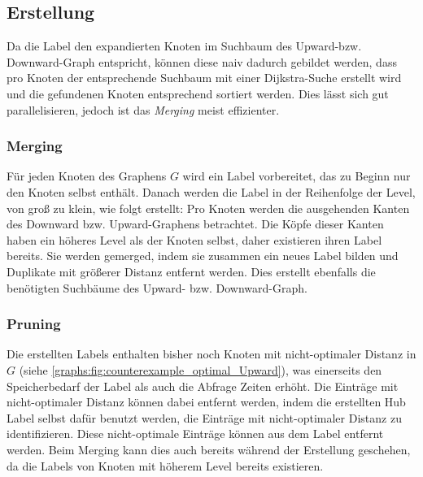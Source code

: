 \subsection{Erstellung}

Da die Label den expandierten Knoten im Suchbaum des Upward-bzw. Downward-Graph entspricht, können diese naiv dadurch gebildet werden, dass pro Knoten der entsprechende Suchbaum mit einer Dijkstra-Suche erstellt wird und die gefundenen Knoten entsprechend sortiert werden.
Dies lässt sich gut parallelisieren, jedoch ist das \emph{Merging} meist effizienter.

\subsubsection{Merging}

Für jeden Knoten des Graphens $G$ wird ein Label vorbereitet, das zu Beginn nur den Knoten selbst enthält.
Danach werden die Label in der Reihenfolge der Level, von groß zu klein, wie folgt erstellt:
Pro Knoten werden die ausgehenden Kanten des Downward bzw. Upward-Graphens betrachtet.
Die Köpfe dieser Kanten haben ein höheres Level als der Knoten selbst, daher existieren ihren Label bereits.
Sie werden gemerged, indem sie zusammen ein neues Label bilden und Duplikate mit größerer Distanz entfernt werden.
Dies erstellt ebenfalls die benötigten Suchbäume des Upward- bzw. Downward-Graph.


\subsubsection{Pruning}

Die erstellten Labels enthalten bisher noch Knoten mit nicht-optimaler Distanz in $G$ (siehe \autoref{graphs:fig:counterexample_optimal_Upward}), was einerseits den Speicherbedarf der  Label als auch die Abfrage Zeiten erhöht.
Die Einträge mit nicht-optimaler Distanz können dabei entfernt werden, indem die erstellten Hub Label selbst dafür benutzt werden, die Einträge mit nicht-optimaler Distanz zu identifizieren.
Diese nicht-optimale Einträge können aus dem Label entfernt werden.
Beim Merging kann dies auch bereits während der Erstellung geschehen, da die Labels von Knoten mit höherem Level bereits existieren.
